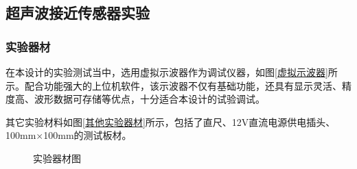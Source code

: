 \subsection{超声波接近传感器实验}
\subsubsection{实验器材}
在本设计的实验测试当中，选用虚拟示波器作为调试仪器，如图\ref{虚拟示波器}所示。配合功能强大的上位机软件，该示波器不仅有基础功能，还具有显示灵活、精度高、波形数据可存储等优点，十分适合本设计的试验调试。\par
其它实验材料如图\ref{其他实验器材}所示，包括了直尺、12V直流电源供电插头、100mm$\times$100mm的测试板材。

\begin{figure}[ht]
	\centering
	\caption{实验器材图}
	\label{实验器材图}
\end{figure}
